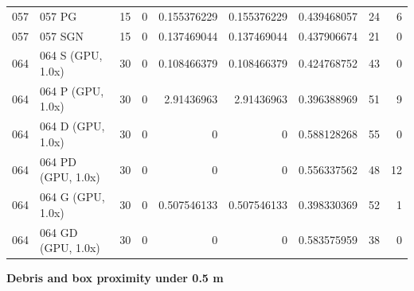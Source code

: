 \begin{tabular}{llrrrrrrr}
057 & 057 PG & 15 & 0 & 0.155376229 & 0.155376229 & 0.439468057 & 24 & 6 \\
057 & 057 SGN & 15 & 0 & 0.137469044 & 0.137469044 & 0.437906674 & 21 & 0 \\
064 & 064 S (GPU, 1.0x) & 30 & 0 & 0.108466379 & 0.108466379 & 0.424768752 & 43 & 0 \\
064 & 064 P (GPU, 1.0x) & 30 & 0 & 2.91436963 & 2.91436963 & 0.396388969 & 51 & 9 \\
064 & 064 D (GPU, 1.0x) & 30 & 0 & 0 & 0 & 0.588128268 & 55 & 0 \\
064 & 064 PD (GPU, 1.0x) & 30 & 0 & 0 & 0 & 0.556337562 & 48 & 12 \\
064 & 064 G (GPU, 1.0x) & 30 & 0 & 0.507546133 & 0.507546133 & 0.398330369 & 52 & 1 \\
064 & 064 GD (GPU, 1.0x) & 30 & 0 & 0 & 0 & 0.583575959 & 38 & 0 \\
\hline
\end{tabular}
\par\medskip
\textbf{Debris and box proximity under 0.5 m}\par\smallskip
